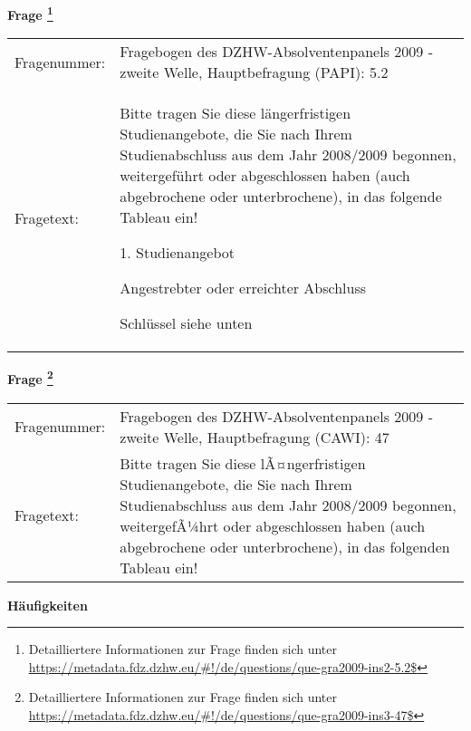 				\vspace*{0.5cm}
                \noindent\textbf{Frage
	                \footnote{Detailliertere Informationen zur Frage finden sich unter
		              \url{https://metadata.fdz.dzhw.eu/\#!/de/questions/que-gra2009-ins2-5.2$}}}\\
				\begin{tabularx}{\hsize}{@{}lX}
					Fragenummer: &
					  Fragebogen des DZHW-Absolventenpanels 2009 - zweite Welle, Hauptbefragung (PAPI):
					  5.2
 \\
					Fragetext: & Bitte tragen Sie diese längerfristigen Studienangebote, die Sie nach Ihrem Studienabschluss aus dem Jahr 2008/2009 begonnen, weitergeführt oder abgeschlossen haben (auch abgebrochene oder unterbrochene), in das folgende Tableau ein!\par  1. Studienangebot\par  Angestrebter oder erreichter Abschluss\par  Schlüssel siehe unten \\
				\end{tabularx}
				\vspace*{0.5cm}
                \noindent\textbf{Frage
	                \footnote{Detailliertere Informationen zur Frage finden sich unter
		              \url{https://metadata.fdz.dzhw.eu/\#!/de/questions/que-gra2009-ins3-47$}}}\\
				\begin{tabularx}{\hsize}{@{}lX}
					Fragenummer: &
					  Fragebogen des DZHW-Absolventenpanels 2009 - zweite Welle, Hauptbefragung (CAWI):
					  47
 \\
					Fragetext: & Bitte tragen Sie diese lÃ¤ngerfristigen Studienangebote, die Sie nach Ihrem Studienabschluss aus dem Jahr 2008/2009 begonnen, weitergefÃ¼hrt oder abgeschlossen haben (auch abgebrochene oder unterbrochene), in das folgenden Tableau ein! \\
				\end{tabularx}





        		\vspace*{0.5cm}
                \noindent\textbf{Häufigkeiten}

